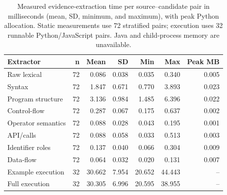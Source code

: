 \begin{table}[t]
\centering
\footnotesize
\caption{Measured evidence-extraction time per source--candidate pair in milliseconds (mean, SD, minimum, and maximum), with peak Python allocation. Static measurements use 72 stratified pairs; execution uses 32 runnable Python/JavaScript pairs. Java and child-process memory are unavailable.}
\label{tab:extractor-costs-measured}
\begin{tabular}{lrrrrrr}
\toprule
Extractor & n & Mean & SD & Min & Max & Peak MB \\
\midrule
Raw lexical & 72 & 0.086 & 0.038 & 0.035 & 0.340 & 0.005 \\
Syntax & 72 & 1.847 & 0.671 & 0.770 & 3.893 & 0.023 \\
Program structure & 72 & 3.136 & 0.984 & 1.485 & 6.396 & 0.022 \\
Control-flow & 72 & 0.287 & 0.067 & 0.175 & 0.637 & 0.002 \\
Operator semantics & 72 & 0.088 & 0.028 & 0.043 & 0.195 & 0.001 \\
API/calls & 72 & 0.088 & 0.058 & 0.033 & 0.513 & 0.003 \\
Identifier roles & 72 & 0.137 & 0.040 & 0.066 & 0.304 & 0.009 \\
Data-flow & 72 & 0.064 & 0.032 & 0.020 & 0.131 & 0.007 \\
Example execution & 32 & 30.662 & 7.954 & 20.652 & 44.443 & -- \\
Full execution & 32 & 30.305 & 6.996 & 20.595 & 38.955 & -- \\
\bottomrule
\end{tabular}
\end{table}

